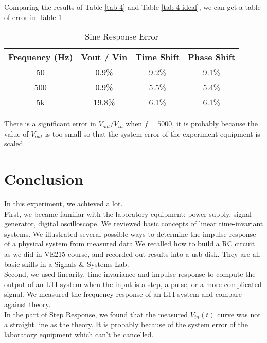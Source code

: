 \documentclass{article}
\begin{document}
Comparing the results of Table \ref{tab-4} and Table \ref{tab-4-ideal}, we can get a table of error in Table \ref{tab-4-error}

\begin{table}[htbp]
	\centering
	\begin{tabular}{|c|c|c|c|}
		\hline
		Frequency (Hz) & Vout / Vin & Time Shift & Phase Shift  \\
		\hline
		50 & 0.9\% & 9.2\% & 9.1\% \\
		\hline
		500 & 0.9\% & 5.5\% & 5.4\% \\
		\hline
		5k & 19.8\% & 6.1\% & 6.1\% \\
		\hline
	\end{tabular}
	\caption{Sine Response Error}
	\label{tab-4-error}
\end{table}

There is a significant error in $V_{out} / V_{in}$ when $f=5000$, it is probably because the value of $V_{out}$ is too small so that the system error of the experiment equipment is scaled.

\section{Conclusion}

In this experiment, we achieved a lot.\\

First, we became familiar with the laboratory equipment: power supply, signal generator, digital oscilloscope. We reviewed basic concepts of linear time-invariant systems. We illustrated several possible ways to determine the impulse response of a physical system from measured data.We recalled how to build a RC circuit as we did in VE215 course, and recorded out results into a usb disk. They are all basic skills in a Signals \& Systems Lab.\\

Second, we used linearity, time-invariance and impulse response to compute the output of an LTI system when the input is a step, a pulse, or a more complicated signal. We measured the frequency response of an LTI system and compare against theory.\\

In the part of Step Response, we found that the measured $V_{in}(t)$ curve was not a straight line as the theory. It is probably because of the system error of the laboratory equipment which can't be cancelled. \\
\end{document}
